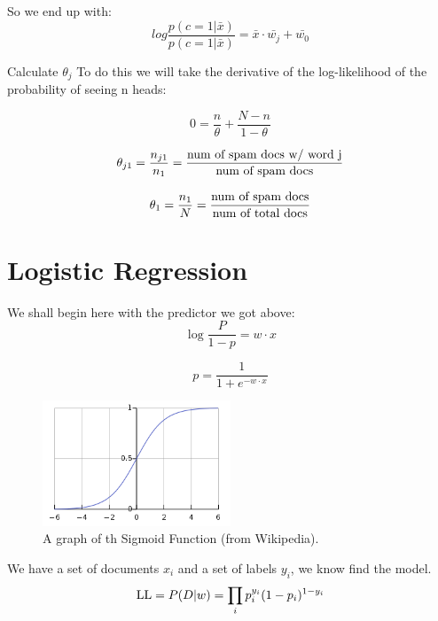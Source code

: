 So we end up with:
\begin{equation}
log\frac{p(c=1|\bar{x})}{p(c=1|\bar{x})} = \bar{x}\cdot\bar{w_{j}} +\bar{w_{0}}
\end{equation}

Calculate $\theta_{j}$
To do this we will take the derivative of the log-likelihood of the probability of seeing n heads:

\begin{equation}
0 = \frac{n}{\theta} + \frac{N - n}{1 - \theta}
\end{equation}

\begin{equation}
\theta_{j1}=\frac{n_{j1}}{n_{1}}=\frac{\textnormal{num of spam docs w/ word j}}{\textnormal{num of spam docs}}
\end{equation}

\begin{equation}
\theta_{1}=\frac{n_{1}}{N}=\frac{\textnormal{num of spam docs}}{\textnormal{num of total docs}}
\end{equation}

\section{Logistic Regression}
We shall begin here with the predictor we got above: 
\begin{equation}
\log{\frac{P}{1-p}} = w\cdot x
\end{equation}

\begin{equation}
p = \frac{1}{1+e^{-w\cdot x}}
\end{equation}
\begin{figure}[ht]
  \begin{center}
    \includegraphics[width=0.5\textwidth]{figures/pic1.png}
    \caption{
      A graph of th Sigmoid Function (from Wikipedia). 
      }
    \label{fig:example_figure}
  \end{center}
\end{figure}
We have a set of documents $x_i$ and a set of labels $y_i$, we know find the model.
\begin{equation}
\textnormal{LL} = P(D|w) = \prod_{i} {p_{i}^{y_{i}} (1-p_{i}) ^ {1-y_{i}}}
\end{equation}

